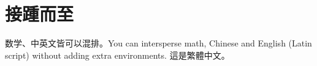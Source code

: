 \section{接踵而至}
\songti
数学、中英文皆可以混排。You can intersperse math, Chinese and English (Latin script) without adding extra environments.
這是繁體中文。